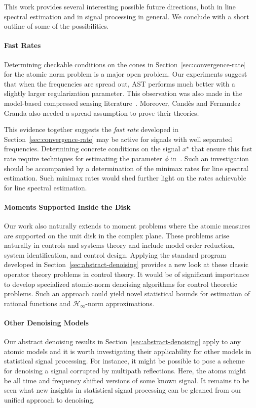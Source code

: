 This work provides several interesting possible future directions, both in line
spectral estimation and in signal processing in general. We conclude with a
short outline of some of the possibilities.

\paragraph{Fast Rates} Determining checkable conditions on the cones in
Section~\ref{sec:convergence-rate} for the atomic norm problem is a major open
problem. Our experiments suggest that when the frequencies are spread out, AST
performs much better with a slightly larger regularization parameter. This
observation was also made in the model-based compressed sensing
literature~\cite{duartescs}. Moreover, Cand\`es and Fernandez Granda also needed
a spread assumption to prove their theories.

This evidence together suggests the \emph{fast rate} developed in
Section~\ref{sec:convergence-rate} may be active for signals with well separated
frequencies. Determining concrete conditions on the signal $x^\star$ that ensure
this fast rate require techniques for estimating the parameter $\phi$
in~. Such an investigation should be accompanied by a
determination of the minimax rates for line spectral estimation. Such minimax
rates would shed further light on the rates achievable for line spectral
estimation.

\paragraph{Moments Supported Inside the Disk} Our work also naturally extends
to moment problems where the atomic measures are supported on the unit disk in
the complex plane. These problems arise naturally in controls and systems
theory and include model order reduction, system identification, and control
design. Applying the standard program developed in
Section~\ref{sec:abstract-denoising} provides a new look at these classic
operator theory problems in control theory. It would be of significant
importance to develop specialized atomic-norm denoising algorithms for control
theoretic problems. Such an approach could yield novel statistical bounds for
estimation of rational functions and $\mathcal{H}_\infty$-norm approximations.

\paragraph{Other Denoising Models} Our abstract denoising results in
Section~\ref{sec:abstract-denoising} apply to any atomic models and it is worth
investigating their applicability for other models in statistical signal
processing. For instance, it might be possible to pose a scheme for denoising a
signal corrupted by multipath reflections. Here, the atoms might be all time
and frequency shifted versions of some known signal. It remains to be seen what
new insights in statistical signal processing can be gleaned from our unified
approach to denoising.

